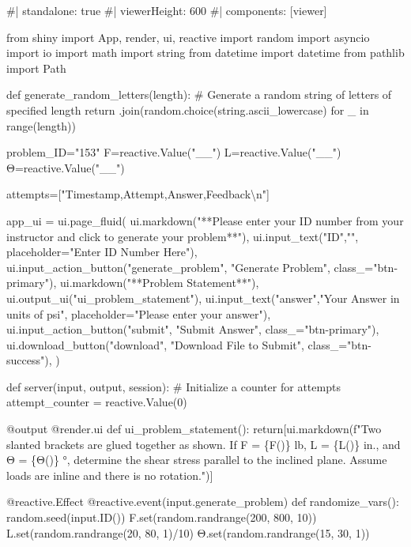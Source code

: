 \documentclass[
  letterpaper,
  DIV=11,
  numbers=noendperiod]{scrreprt}
\newenvironment{Shaded}{\begin{snugshade}}{\end{snugshade}}
\newcommand{\NormalTok}[1]{\textcolor[rgb]{0.00,0.23,0.31}{#1}}
\begin{document}
\begin{Shaded}
\begin{Highlighting}[]
\NormalTok{\#| standalone: true}
\NormalTok{\#| viewerHeight: 600}
\NormalTok{\#| components: [viewer]}

\NormalTok{from shiny import App, render, ui, reactive}
\NormalTok{import random}
\NormalTok{import asyncio}
\NormalTok{import io}
\NormalTok{import math}
\NormalTok{import string}
\NormalTok{from datetime import datetime}
\NormalTok{from pathlib import Path}

\NormalTok{def generate\_random\_letters(length):}
\NormalTok{    \# Generate a random string of letters of specified length}
\NormalTok{    return \textquotesingle{}\textquotesingle{}.join(random.choice(string.ascii\_lowercase) for \_ in range(length))  }

\NormalTok{problem\_ID="153"}
\NormalTok{F=reactive.Value("\_\_")}
\NormalTok{L=reactive.Value("\_\_")}
\NormalTok{Θ=reactive.Value("\_\_")}

\NormalTok{attempts=["Timestamp,Attempt,Answer,Feedback\textbackslash{}n"]}

\NormalTok{app\_ui = ui.page\_fluid(}
\NormalTok{    ui.markdown("**Please enter your ID number from your instructor and click to generate your problem**"),}
\NormalTok{    ui.input\_text("ID","", placeholder="Enter ID Number Here"),}
\NormalTok{    ui.input\_action\_button("generate\_problem", "Generate Problem", class\_="btn{-}primary"),}
\NormalTok{    ui.markdown("**Problem Statement**"),}
\NormalTok{    ui.output\_ui("ui\_problem\_statement"),}
\NormalTok{    ui.input\_text("answer","Your Answer in units of psi", placeholder="Please enter your answer"),}
\NormalTok{    ui.input\_action\_button("submit", "Submit Answer", class\_="btn{-}primary"),}
\NormalTok{    ui.download\_button("download", "Download File to Submit", class\_="btn{-}success"),}
\NormalTok{)}


\NormalTok{def server(input, output, session):}
\NormalTok{    \# Initialize a counter for attempts}
\NormalTok{    attempt\_counter = reactive.Value(0)}

\NormalTok{    @output}
\NormalTok{    @render.ui}
\NormalTok{    def ui\_problem\_statement():}
\NormalTok{        return[ui.markdown(f"Two slanted brackets are glued together as shown. If F = \{F()\} lb, L = \{L()\} in., and Θ = \{Θ()\} °, determine the shear stress parallel to the inclined plane. Assume loads are inline and there is no rotation.")]}
    
\NormalTok{    @reactive.Effect}
\NormalTok{    @reactive.event(input.generate\_problem)}
\NormalTok{    def randomize\_vars():}
\NormalTok{        random.seed(input.ID())}
\NormalTok{        F.set(random.randrange(200, 800, 10))}
\NormalTok{        L.set(random.randrange(20, 80, 1)/10)}
\NormalTok{        Θ.set(random.randrange(15, 30, 1))}
        


\end{Highlighting}
\end{Shaded}
\end{document}
